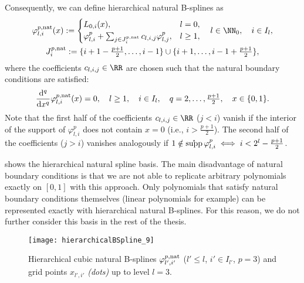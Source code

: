 %
Consequently, we can define hierarchical natural B-splines as
\begin{subequations}
  \begin{gather}
    \varphi_{l,i}^{p,\ntrl}(x)
    :=
    \begin{cases}
      L_{0,i}(x),&
      l = 0,\\
      \varphi_{l,i}^p +
      \sum_{j \in J_i^{p,\ntrl}} c_{l,i,j} \varphi_{l,j}^p,&
      l \ge 1,
    \end{cases}\quad
    l \in \NN_0,\quad
    i \in I_l,\\
    J_i^{p,\ntrl}
    := \{i+1-\tfrac{p+1}{2}, \dotsc, i-1\} \cup
    \{i+1, \dotsc, i-1+\tfrac{p+1}{2}\},
  \end{gather}
\end{subequations}
where the coefficients $c_{l,i,j} \in \RR$ are chosen such that
the natural boundary conditions are satisfied:
\begin{equation}
  \frac{\mathop{}\!\mathrm{d}^q}{\mathop{}\!\mathrm{d}{}x^q} \varphi_{l,i}^{p,\mathrm{nat}}(x)
  = 0,\quad
  l \ge 1,\quad
  i \in I_l,\quad
  q = 2, \dotsc, \tfrac{p+1}{2},\quad
  x \in \{0, 1\}.
\end{equation}
%
Note that the first half of the coefficients $c_{l,i,j} \in \RR$
($j < i$) vanish if the interior of the support of $\varphi_{l,i}^p$
does not contain $x = 0$
(i.e., $i > \tfrac{p+1}{2}$).
The second half of the coefficients ($j > i$) vanishes analogously
if $1 \notin \operatorname{\mathring{\operatorname{supp}}} \varphi_{l,i}^p \iff i < 2^l - \tfrac{p+1}{2}$.

 shows the hierarchical natural spline basis.
The main disadvantage of natural boundary conditions is that
we are not able to replicate arbitrary polynomials exactly on $[0, 1]$
with this approach.
Only polynomials that satisfy natural boundary conditions themselves
(linear polynomials for example)
can be represented exactly with hierarchical natural B-splines.
For this reason, we do not further consider this basis in the
rest of the thesis.

\begin{SCfigure}
  \texttt{[image: hierarchicalBSpline\_9]}%
  \caption{%
    Hierarchical cubic natural B-splines
    $\varphi_{l',i'}^{p,\mathrm{nat}}$
    ($l' \le l$, $i' \in I_{l'}$, $p = 3$) and
    grid points $x_{l',i'}$ \emph{(dots)} up to level $l = 3$.%
  }%
  \label{fig:naturalBSpline}%
\end{SCfigure}
